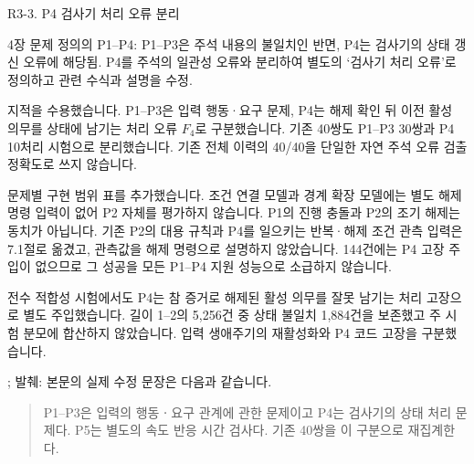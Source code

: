\begin{reviewitem}{R3-3. P4 검사기 처리 오류 분리}

\begin{reviewercomment}

4장 문제 정의의 P1–P4: P1–P3은 주석 내용의 불일치인 반면, P4는 검사기의 상태 갱신 오류에 해당됨. P4를 주석의 일관성 오류와 분리하여 별도의 ‘검사기 처리 오류’로 정의하고 관련 수식과 설명을 수정.

\end{reviewercomment}

\begin{authorresponse}

지적을 수용했습니다. P1–P3은 입력 행동·요구 문제, P4는 해제 확인 뒤 이전 활성 의무를 상태에 남기는 처리 오류 $F_4$로 구분했습니다. 기존 40쌍도 P1–P3 30쌍과 P4 10처리 시험으로 분리했습니다. 기존 전체 이력의 40/40을 단일한 자연 주석 오류 검출 정확도로 쓰지 않습니다.

문제별 구현 범위 표를 추가했습니다. 조건 연결 모델과 경계 확장 모델에는 별도 해제 명령 입력이 없어 P2 자체를 평가하지 않습니다. P1의 진행 충돌과 P2의 조기 해제는 동치가 아닙니다. 기존 P2의 대용 규칙과 P4를 일으키는 반복·해제 조건 관측 입력은 7.1절로 옮겼고, 관측값을 해제 명령으로 설명하지 않았습니다. 144건에는 P4 고장 주입이 없으므로 그 성공을 모든 P1–P4 지원 성능으로 소급하지 않습니다.

전수 적합성 시험에서도 P4는 참 증거로 해제된 활성 의무를 잘못 남기는 처리 고장으로 별도 주입했습니다. 길이 1–2의 5,256건 중 상태 불일치 1,884건을 보존했고 주 시험 분모에 합산하지 않았습니다. 입력 생애주기의 재활성화와 P4 코드 고장을 구분했습니다.

\end{authorresponse}

\begin{manuscriptrevision}{; 발췌: }
본문의 실제 수정 문장은 다음과 같습니다.

\begin{quote}
P1--P3은 입력의 행동ㆍ요구 관계에 관한 문제이고 P4는 검사기의 상태 처리 문제다. P5는 별도의 속도 반응 시간 검사다. 기존 40쌍을 이 구분으로 재집계한다.
\end{quote}
\end{manuscriptrevision}

\end{reviewitem}

\clearpage

